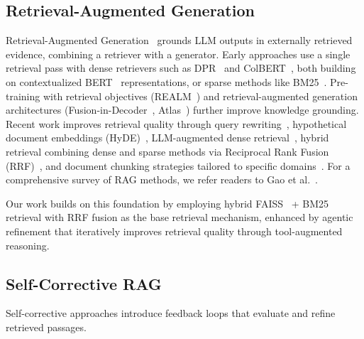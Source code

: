 
\subsection{Retrieval-Augmented Generation}
\label{subsec:rw_rag}

Retrieval-Augmented Generation~\cite{lewis2020rag} grounds LLM outputs in externally retrieved evidence, combining a retriever with a generator.
Early approaches use a single retrieval pass with dense retrievers such as DPR~\cite{karpukhin2020dense} and ColBERT~\cite{khattab2020colbert}, both building on contextualized BERT~\cite{devlin2019bert} representations, or sparse methods like BM25~\cite{robertson2009bm25}.
Pre-training with retrieval objectives (REALM~\cite{guu2020realm}) and retrieval-augmented generation architectures (Fusion-in-Decoder~\cite{izacard2021leveraging}, Atlas~\cite{izacard2023atlas}) further improve knowledge grounding.
Recent work improves retrieval quality through query rewriting~\cite{ma2023query}, hypothetical document embeddings (HyDE)~\cite{gao2023hyde}, LLM-augmented dense retrieval~\cite{peng2025sptar,silva2024improving}, hybrid retrieval combining dense and sparse methods via Reciprocal Rank Fusion (RRF)~\cite{cormack2009rrf}, and document chunking strategies tailored to specific domains~\cite{zhao2025metachunking,jimeno2024financial}.
For a comprehensive survey of RAG methods, we refer readers to Gao et al.~\cite{gao2024ragsurvey}.

Our work builds on this foundation by employing hybrid FAISS~\cite{johnson2019faiss} + BM25 retrieval with RRF fusion as the base retrieval mechanism, enhanced by agentic refinement that iteratively improves retrieval quality through tool-augmented reasoning.

\subsection{Self-Corrective RAG}
\label{subsec:rw_corrective}

Self-corrective approaches introduce feedback loops that evaluate and refine retrieved passages.

